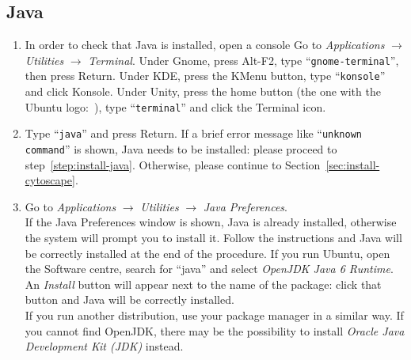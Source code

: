 \subsection{Java}\label{sec:install-java}
\begin{enumerate}
\item\label{step:open-console} In order to check that Java is installed, open a console
%
{Go to \emph{Applications} $\rightarrow$ \emph{Utilities} $\rightarrow$ \emph{Terminal}.}%
{Under Gnome, press Alt-F2, type ``{\tt gnome-terminal}'', then press Return. Under KDE, press the KMenu button, type
``{\tt konsole}'' and click Konsole. Under Unity, press the home button (the one with the Ubuntu
logo:~\ubuntusymbol), type ``{\tt terminal}'' and click the Terminal icon.}
\item Type ``{\tt java}'' and press Return. If a brief error message like ``{\tt unknown command}'' is shown, Java needs to be
installed: please proceed to step~\ref{step:install-java}. Otherwise, please continue to Section~\ref{sec:install-cytoscape}.
\item\label{step:install-java}
%
{Go to \emph{Applications} $\rightarrow$ \emph{Utilities} $\rightarrow$ \emph{Java Preferences}.\\
If the Java Preferences window is shown, Java is already installed, otherwise the system will prompt you to install
it. Follow the instructions and Java will be correctly installed at the end of the procedure.}%
{If you run Ubuntu, open the Software centre, search for ``java'' and select \emph{OpenJDK Java 6 Runtime}. An
\emph{Install} button
will appear next to the name of the package: click that button and Java will be correctly installed.\\
If you run another distribution, use your package manager in a similar way. If you cannot find OpenJDK, there may be
the possibility to install \emph{Oracle Java Development Kit (JDK)} instead.}
\end{enumerate}


